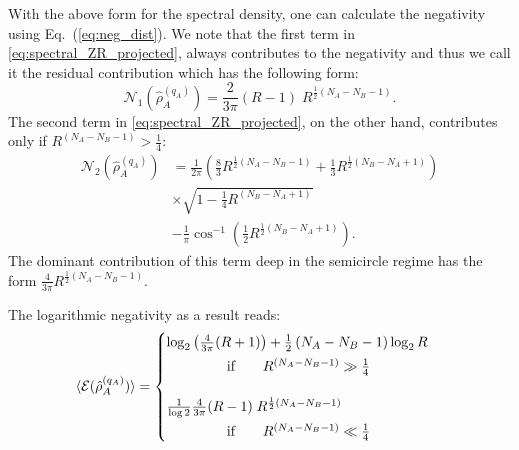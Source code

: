 \documentclass[aps,pra,reprint,superscriptaddress,twocolumn,notitlepage]{revtex4-1}
\numberwithin{equation}{section}
\begin{document}
With the above form for the spectral density, one can calculate the negativity using Eq.~(\ref{eq:neg_dist}).
We note that the first term in \eqref{eq:spectral_ZR_projected}, always contributes to the negativity and thus we call it the residual contribution which has the following form:
\begin{equation}
    \label{eq:N1-Zr-sc}
    \mathcal{N}_{1}(\hat\rho_{A}^{(q_A)}) = \frac{2}{3\pi} (R-1) \; R^{\frac12 \left( N_A - N_B - 1 \right)}.
\end{equation}
The second term in \eqref{eq:spectral_ZR_projected}, on the other hand, contributes only if $R^{\left( N_A - N_B - 1 \right)} > \frac14$:
\begin{equation}
\begin{aligned}
    \label{eq:N2-Zr-sc}
    \mathcal{N}_{2}(\hat\rho_{A}^{(q_A)}) &= \frac{1}{2\pi} \left( \frac83 R^{\frac12 \left( N_A - N_B -1 \right)} + \frac13 R^{\frac12 \left( N_B - N_A + 1 \right)}  \right) \\
    & \times \sqrt{ 1 - \frac14 R^{ \left( N_B - N_A + 1 \right)} } \\
    & - \frac{1}{\pi} \cos^{-1} \left( \frac12 R^{\frac12 \left( N_B - N_A + 1 \right)}  \right).
\end{aligned}
\end{equation}
The dominant contribution of this term deep in the semicircle regime has the form $\frac{4}{3\pi} R^{\frac12 \left( N_A - N_B -1 \right)}$.



The logarithmic negativity as a result reads:
\begin{equation}
      \langle\mathcal{E}(\hat\rho_A^{(q_A)})\rangle = 
     \begin{cases} 
       \log_2\left(\frac{4}{3\pi} (R+1) \right) + \frac12 \left( N_A - N_B - 1 \right) \log_2R  \vspace{0.1cm}\\
       \qquad \qquad \text{ if} \qquad R^{\left( N_A - N_B - 1 \right)} \gg \frac14 \\
       \phantom{a}\\
      \frac{1}{\log2}\frac{4}{3\pi} (R-1) \; R^{\frac12 \left( N_A - N_B - 1 \right)} \vspace{0.1cm}\\
       \qquad \qquad \text{ if} \qquad R^{\left( N_A - N_B - 1 \right)} \ll \frac14 
   \end{cases}
\end{equation}
\end{document}

